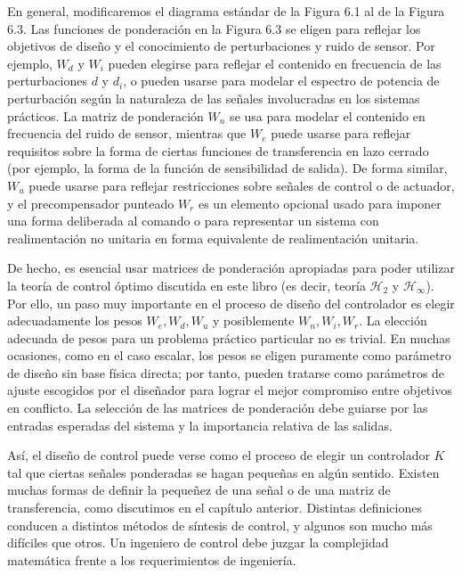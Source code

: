 En general, modificaremos el diagrama estándar de la Figura 6.1 al de la Figura 6.3. Las funciones de ponderación en la Figura 6.3 se eligen para reflejar los objetivos de diseño y el conocimiento de perturbaciones y ruido de sensor. Por ejemplo, $W_{d}$ y $W_{i}$ pueden elegirse para reflejar el contenido en frecuencia de las perturbaciones $d$ y $d_{i}$, o pueden usarse para modelar el espectro de potencia de perturbación según la naturaleza de las señales involucradas en los sistemas prácticos. La matriz de ponderación $W_{n}$ se usa para modelar el contenido en frecuencia del ruido de sensor, mientras que $W_{e}$ puede usarse para reflejar requisitos sobre la forma de ciertas funciones de transferencia en lazo cerrado (por ejemplo, la forma de la función de sensibilidad de salida). De forma similar, $W_{u}$ puede usarse para reflejar restricciones sobre señales de control o de actuador, y el precompensador punteado $W_{r}$ es un elemento opcional usado para imponer una forma deliberada al comando o para representar un sistema con realimentación no unitaria en forma equivalente de realimentación unitaria.

De hecho, es esencial usar matrices de ponderación apropiadas para poder utilizar la teoría de control óptimo discutida en este libro (es decir, teoría $\mathcal{H}_{2}$ y $\mathcal{H}_{\infty}$). Por ello, un paso muy importante en el proceso de diseño del controlador es elegir adecuadamente los pesos $W_{e}, W_{d}, W_{u}$ y posiblemente $W_{n}, W_{i}, W_{r}$. La elección adecuada de pesos para un problema práctico particular no es trivial. En muchas ocasiones, como en el caso escalar, los pesos se eligen puramente como parámetro de diseño sin base física directa; por tanto, pueden tratarse como parámetros de ajuste escogidos por el diseñador para lograr el mejor compromiso entre objetivos en conflicto. La selección de las matrices de ponderación debe guiarse por las entradas esperadas del sistema y la importancia relativa de las salidas.

Así, el diseño de control puede verse como el proceso de elegir un controlador $K$ tal que ciertas señales ponderadas se hagan pequeñas en algún sentido. Existen muchas formas de definir la pequeñez de una señal o de una matriz de transferencia, como discutimos en el capítulo anterior. Distintas definiciones conducen a distintos métodos de síntesis de control, y algunos son mucho más difíciles que otros. Un ingeniero de control debe juzgar la complejidad matemática frente a los requerimientos de ingeniería.

